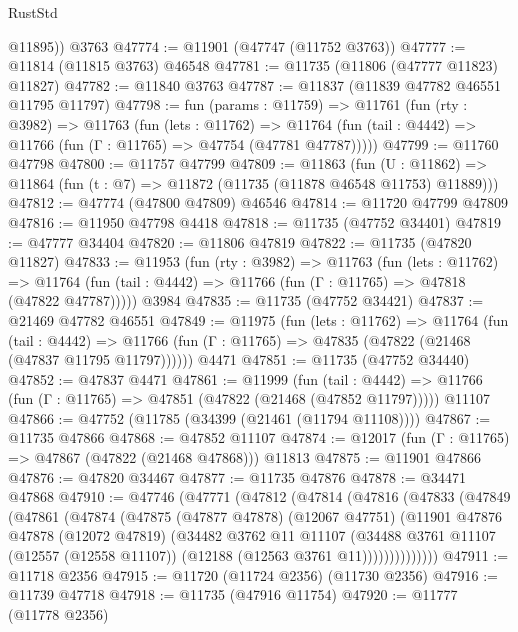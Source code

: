 \begin{lexlean}{RustStd}
\begin{coremodule}
        @11895))
    @3763
@47774 := @11901 (@47747 (@11752 @3763))
@47777 := @11814 (@11815 @3763) @46548
@47781 := @11735 (@11806 (@47777 @11823) @11827)
@47782 := @11840 @3763
@47787 := @11837 (@11839 @47782 @46551 @11795 @11797)
@47798 := fun (params : @11759) =>
  @11761
    (fun (rty : @3982) =>
    @11763
      (fun (lets : @11762) =>
      @11764 (fun (tail : @4442) => @11766 (fun (Γ : @11765) => @47754 (@47781 @47787)))))
@47799 := @11760 @47798
@47800 := @11757 @47799
@47809 := @11863
    (fun (U : @11862) => @11864 (fun (t : @7) => @11872 (@11735 (@11878 @46548 @11753) @11889)))
@47812 := @47774 (@47800 @47809) @46546
@47814 := @11720 @47799 @47809
@47816 := @11950 @47798 @4418
@47818 := @11735 (@47752 @34401)
@47819 := @47777 @34404
@47820 := @11806 @47819
@47822 := @11735 (@47820 @11827)
@47833 := @11953
    (fun (rty : @3982) =>
    @11763
      (fun (lets : @11762) =>
      @11764 (fun (tail : @4442) => @11766 (fun (Γ : @11765) => @47818 (@47822 @47787)))))
    @3984
@47835 := @11735 (@47752 @34421)
@47837 := @21469 @47782 @46551
@47849 := @11975
    (fun (lets : @11762) =>
    @11764
      (fun (tail : @4442) =>
      @11766 (fun (Γ : @11765) => @47835 (@47822 (@21468 (@47837 @11795 @11797))))))
    @4471
@47851 := @11735 (@47752 @34440)
@47852 := @47837 @4471
@47861 := @11999
    (fun (tail : @4442) => @11766 (fun (Γ : @11765) => @47851 (@47822 (@21468 (@47852 @11797)))))
    @11107
@47866 := @47752 (@11785 (@34399 (@21461 (@11794 @11108))))
@47867 := @11735 @47866
@47868 := @47852 @11107
@47874 := @12017 (fun (Γ : @11765) => @47867 (@47822 (@21468 @47868))) @11813
@47875 := @11901 @47866
@47876 := @47820 @34467
@47877 := @11735 @47876
@47878 := @34471 @47868
@47910 := @47746
    (@47771
      (@47812
        (@47814
          (@47816
            (@47833
              (@47849
                (@47861
                  (@47874
                    (@47875
                      (@47877 @47878)
                      (@12067 @47751)
                      (@11901
                        @47876
                        @47878
                        (@12072 @47819)
                        (@34482
                          @3762
                          @11
                          @11107
                          (@34488
                            @3761
                            @11107
                            (@12557 (@12558 @11107))
                            (@12188 (@12563 @3761 @11))))))))))))))
@47911 := @11718 @2356
@47915 := @11720 (@11724 @2356) (@11730 @2356)
@47916 := @11739 @47718
@47918 := @11735 (@47916 @11754)
@47920 := @11777 (@11778 @2356)

\end{coremodule}
\end{lexlean}
